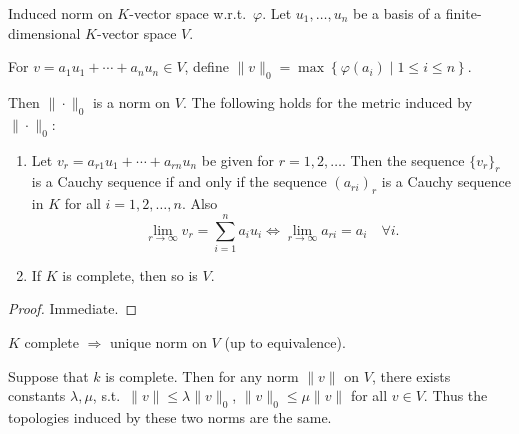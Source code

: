 \documentclass[11pt, a4paper]{report}
\begin{document}
\begin{lemma}
Induced norm on $K$-vector space w.r.t.\ $\varphi$. Let $u_{1}, \ldots, u_{n}$ be a basis of a finite-dimensional $K$-vector space $V$.

For $v=a_{1} u_{1}+\cdots+a_{n} u_{n} \in V$, define $\|v\|_{0}=\max \left\{\varphi\left(a_{i}\right) \mid 1 \leq i \leq n\right\}$.

Then $\|\cdot\|_{0}$ is a norm on $V$. The following holds for the metric induced by $\|\cdot\|_{0}$:
\begin{enumerate}
\item Let $v_{r}=a_{r1} u_{1}+\cdots+a_{rn} u_{n}$ be given for $r=1,2, \ldots$. Then the sequence $\{v_{r}\}_{r}$ is a Cauchy sequence if and only if the sequence $(a_{ri})_{r}$ is a Cauchy sequence in $K$ for all $i=1,2, \ldots, n$. Also
\[
\lim _{r \rightarrow \infty} v_{r}=\sum_{i=1}^{n} a_{i} u_{i} \Leftrightarrow \lim _{r \rightarrow \infty} a_{ri}=a_{i} \quad \forall i.
\]
\item If $K$ is complete, then so is $V$.
\end{enumerate}
\end{lemma}

\begin{proof}
Immediate.
\end{proof}

\begin{lemma}
$K$ complete $\Rightarrow$ unique norm on $V$ (up to equivalence).
\end{lemma}
Suppose that $k$ is complete. Then for any norm $\|v\|$ on $V$, there exists constants $\lambda, \mu$, s.t.\ $\|v\| \leqslant \lambda\|v\|_{0}$, $\|v\|_{0} \leqslant \mu\|v\|$ for all $v \in V$.
Thus the topologies induced by these two norms are the same.
\end{document}
